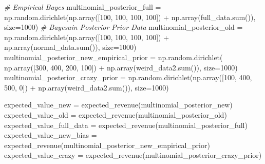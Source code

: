 \documentclass[]{tufte-book}
\newenvironment{Shaded}{}{}
\newcommand{\BuiltInTok}[1]{#1}
\newcommand{\CommentTok}[1]{\textcolor[rgb]{0.38,0.63,0.69}{\textit{#1}}}
\newcommand{\DecValTok}[1]{\textcolor[rgb]{0.25,0.63,0.44}{#1}}
\newcommand{\NormalTok}[1]{#1}
\newcommand{\OperatorTok}[1]{\textcolor[rgb]{0.40,0.40,0.40}{#1}}
\theoremstyle{definition}
\theoremstyle{definition}
\theoremstyle{definition}
\theoremstyle{remark}
\begin{document}
\begin{Shaded}
\begin{Highlighting}[]
\CommentTok{\# Empirical Bayes}
\NormalTok{multinomial\_posterior\_full }\OperatorTok{=}\NormalTok{ np.random.dirichlet(np.array([}\DecValTok{100}\NormalTok{, }
\DecValTok{100}\NormalTok{, }\DecValTok{100}\NormalTok{, }\DecValTok{100}\NormalTok{]) }\OperatorTok{+}\NormalTok{ np.array(full\_data.}\BuiltInTok{sum}\NormalTok{()), size}\OperatorTok{=}\DecValTok{1000}\NormalTok{)}
\CommentTok{\# Bayesain Posterior Prior Data}
\NormalTok{multinomial\_posterior\_old }\OperatorTok{=}\NormalTok{ np.random.dirichlet(np.array([}\DecValTok{100}\NormalTok{, }
\DecValTok{100}\NormalTok{, }\DecValTok{100}\NormalTok{, }\DecValTok{100}\NormalTok{]) }\OperatorTok{+}\NormalTok{ np.array(normal\_data.}\BuiltInTok{sum}\NormalTok{()), size}\OperatorTok{=}\DecValTok{1000}\NormalTok{)}
\NormalTok{multinomial\_posterior\_new\_empirical\_prior }\OperatorTok{=}\NormalTok{ np.random.dirichlet(}
\NormalTok{  np.array([}\DecValTok{300}\NormalTok{, }\DecValTok{400}\NormalTok{, }\DecValTok{200}\NormalTok{, }\DecValTok{100}\NormalTok{]) }\OperatorTok{+} 
\NormalTok{  np.array(weird\_data2.}\BuiltInTok{sum}\NormalTok{()), size}\OperatorTok{=}\DecValTok{1000}\NormalTok{)}
\NormalTok{multinomial\_posterior\_crazy\_prior }\OperatorTok{=}\NormalTok{ np.random.dirichlet(np.array([}\DecValTok{100}\NormalTok{, }
\DecValTok{400}\NormalTok{, }\DecValTok{500}\NormalTok{, }\DecValTok{0}\NormalTok{]) }\OperatorTok{+}\NormalTok{ np.array(weird\_data2.}\BuiltInTok{sum}\NormalTok{()), size}\OperatorTok{=}\DecValTok{1000}\NormalTok{)}

\NormalTok{expected\_value\_new }\OperatorTok{=}\NormalTok{ expected\_revenue(multinomial\_posterior\_new)}
\NormalTok{expected\_value\_old }\OperatorTok{=}\NormalTok{ expected\_revenue(multinomial\_posterior\_old)}
\NormalTok{expected\_value\_full\_data }\OperatorTok{=}\NormalTok{ expected\_revenue(multinomial\_posterior\_full)}
\NormalTok{expected\_value\_new\_bias }\OperatorTok{=}\NormalTok{ expected\_revenue(multinomial\_posterior\_new\_empirical\_prior)}
\NormalTok{expected\_value\_crazy }\OperatorTok{=}\NormalTok{ expected\_revenue(multinomial\_posterior\_crazy\_prior)}


\end{Highlighting}
\end{Shaded}
\end{document}
